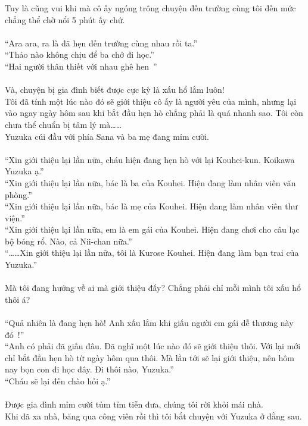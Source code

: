 \documentclass[12pt,a4paper, twosides]{book}
\begin{document}
Tuy là cũng vui khi mà cô ấy ngóng trông chuyện đến trường cùng tôi đến mức chẳng thể chờ nổi 5 phút ấy chứ.\\
\\
“Ara ara, ra là đã hẹn đến trường cùng nhau rồi ta.”\\
“Thảo nào không chịu để ba chở đi học.”\\
“Hai người thân thiết với nhau ghê hen~”\\
\\
Và, chuyện bị gia đình biết được cực kỳ là xấu hổ lắm luôn!\\
Tôi đã tính một lúc nào đó sẽ giới thiệu cô ấy là người yêu của mình, nhưng lại vào ngay ngày hôm sau khi bắt đầu hẹn hò chẳng phải là quá nhanh sao. Tôi còn chưa thể chuẩn bị tâm lý mà……\\
Yuzuka cúi đầu với phía Sana và ba mẹ đang mỉm cười.\\
\\
“Xin giới thiệu lại lần nữa, cháu hiện đang hẹn hò với lại Kouhei-kun. Koikawa Yuzuka ạ.”\\
“Xin giới thiệu lại lần nữa, bác là ba của Kouhei. Hiện đang làm nhân viên văn phòng.”\\
“Xin giới thiệu lại lần nữa, bác là mẹ của Kouhei. Hiện đang làm nhân viên thư viện.”\\
“Xin giới thiệu lại lần nữa, em là em gái của Kouhei. Hiện đang chơi cho câu lạc bộ bóng rổ. Nào, cả Nii-chan nữa.”\\
“……Xin giới thiệu lại lần nữa, tôi là Kurose Kouhei. Hiện đang làm bạn trai của Yuzuka.”\\
\\
Mà tôi đang hướng về ai mà giới thiệu đấy? Chẳng phải chỉ mỗi mình tôi xấu hổ thôi á?\\
\\
“Quả nhiên là đang hẹn hò! Anh xấu lắm khi giấu người em gái dễ thương này đó~!”\\
“Anh có phải đã giấu đâu. Đã nghĩ một lúc nào đó sẽ giới thiệu thôi. Với lại mới chỉ bắt đầu hẹn hò từ ngày hôm qua thôi. Mà lần tới sẽ lại giới thiệu, nên hôm nay bọn con đi học đây. Đi thôi nào, Yuzuka.”\\
“Cháu sẽ lại đến chào hỏi ạ.”\\
\\
Được gia đình mỉm cười tủm tỉm tiễn đưa, chúng tôi rời khỏi mái nhà.\\
Khi đã xa nhà, băng qua công viên rồi thì tôi bắt chuyện với Yuzuka ở đằng sau.\\
\\
\end{document}
